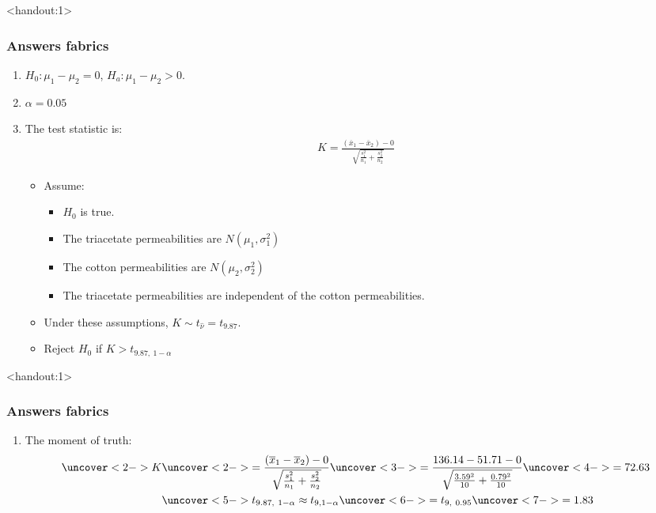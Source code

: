 \documentclass[handout]{beamer}\usepackage{graphicx, color}
\newcommand{\answers}{1}
\providecommand{\ov}[1]{\overline{#1}}
\providecommand{\wh}[1]{\widehat{#1}}
\numberwithin{equation}{section}
\begin{document}
\begin{frame}<handout:\answers>
\frametitle{Answers fabrics}
\begin{enumerate}[1. ]
\item $H_0:  \mu_1 - \mu_2 = 0$, $H_a: \mu_1 - \mu_2 > 0$.
\pause \item $\alpha = 0.05$
\pause \item The test statistic is:
\pause \begin{align*}
K = \frac{(\ov{x}_1 - \ov{x}_2) - 0}{ \sqrt{\frac{s_1^2}{n_1} + \frac{s_2^2}{n_2}}} 
\end{align*}
\begin{itemize}
\pause \item Assume:
\begin{itemize}
\pause \item $H_0$ is true.
\pause \item The triacetate permeabilities are $N(\mu_1, \sigma^2_1)$
\pause \item The cotton permeabilities are $N(\mu_2, \sigma^2_2)$
\pause \item The triacetate permeabilities are independent of the cotton permeabilities.
\end{itemize}
\pause \item Under these assumptions, $K \sim t_{\wh{\nu}} = t_{9.87}$.
\pause \item Reject $H_0$ if $K > t_{9.87, \ 1 - \alpha}$
\end{itemize}
\setcounter{saveenum}{\value{enumi}}

\end{enumerate}
\end{frame}

\begin{frame}<handout:\answers>
\frametitle{Answers fabrics}
\begin{enumerate}[1. ]
\setcounter{enumi}{\value{saveenum}}
\item The moment of truth:
\begin{align*}
\uncover<2->{K} & \uncover<2->{=  \frac{(\ov{x}_1 - \ov{x}_2) - 0}{ \sqrt{\frac{s_1^2}{n_1} + \frac{s_2^2}{n_2}}}} \uncover<3->{= \frac{136.14 - 51.71 - 0}{ \sqrt{\frac{3.59^2}{10} + \frac{0.79^2}{10}}}} \uncover<4->{ = 72.63} \\
&\uncover<5->{t_{9.87, \ 1 - \alpha} \approx  t_{9, 1- \alpha}} \uncover<6->{ = t_{9, \ 0.95}} \uncover<7->{ =  1.83} \\
\end{align*}
\end{enumerate}
\end{frame}
\end{document}

